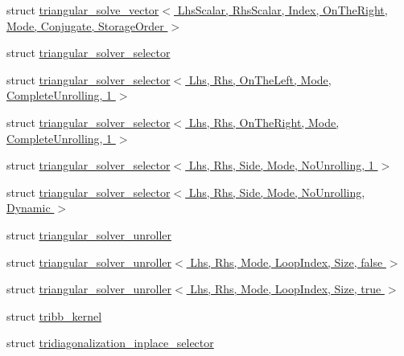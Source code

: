 \begin{DoxyCompactItemize}
struct \hyperlink{struct_eigen_1_1internal_1_1triangular__solve__vector_3_01_lhs_scalar_00_01_rhs_scalar_00_01_ind2257c92bae887c34b8b6b704148c0908}{triangular\+\_\+solve\+\_\+vector$<$ Lhs\+Scalar, Rhs\+Scalar, Index, On\+The\+Right, Mode, Conjugate, Storage\+Order $>$}
\item 
struct \hyperlink{struct_eigen_1_1internal_1_1triangular__solver__selector}{triangular\+\_\+solver\+\_\+selector}
\item 
struct \hyperlink{struct_eigen_1_1internal_1_1triangular__solver__selector_3_01_lhs_00_01_rhs_00_01_on_the_left_00d738951dca8e27ae91ede40ea882f73c}{triangular\+\_\+solver\+\_\+selector$<$ Lhs, Rhs, On\+The\+Left, Mode, Complete\+Unrolling, 1 $>$}
\item 
struct \hyperlink{struct_eigen_1_1internal_1_1triangular__solver__selector_3_01_lhs_00_01_rhs_00_01_on_the_right_0718422e7095664eb478cc4024fd5b399}{triangular\+\_\+solver\+\_\+selector$<$ Lhs, Rhs, On\+The\+Right, Mode, Complete\+Unrolling, 1 $>$}
\item 
struct \hyperlink{struct_eigen_1_1internal_1_1triangular__solver__selector_3_01_lhs_00_01_rhs_00_01_side_00_01_modf7016aec58372d55e43776676d69f5fb}{triangular\+\_\+solver\+\_\+selector$<$ Lhs, Rhs, Side, Mode, No\+Unrolling, 1 $>$}
\item 
struct \hyperlink{struct_eigen_1_1internal_1_1triangular__solver__selector_3_01_lhs_00_01_rhs_00_01_side_00_01_mod9d4c365fbf3ecd733e3c477f950cfbe8}{triangular\+\_\+solver\+\_\+selector$<$ Lhs, Rhs, Side, Mode, No\+Unrolling, Dynamic $>$}
\item 
struct \hyperlink{struct_eigen_1_1internal_1_1triangular__solver__unroller}{triangular\+\_\+solver\+\_\+unroller}
\item 
struct \hyperlink{struct_eigen_1_1internal_1_1triangular__solver__unroller_3_01_lhs_00_01_rhs_00_01_mode_00_01_looefec01585c67928d42a9958d8c8f161e}{triangular\+\_\+solver\+\_\+unroller$<$ Lhs, Rhs, Mode, Loop\+Index, Size, false $>$}
\item 
struct \hyperlink{struct_eigen_1_1internal_1_1triangular__solver__unroller_3_01_lhs_00_01_rhs_00_01_mode_00_01_loo770c06e8f4c15ef547184369307ea3d8}{triangular\+\_\+solver\+\_\+unroller$<$ Lhs, Rhs, Mode, Loop\+Index, Size, true $>$}
\item 
struct \hyperlink{struct_eigen_1_1internal_1_1tribb__kernel}{tribb\+\_\+kernel}
\item 
struct \hyperlink{struct_eigen_1_1internal_1_1tridiagonalization__inplace__selector}{tridiagonalization\+\_\+inplace\+\_\+selector}

\end{DoxyCompactItemize}
